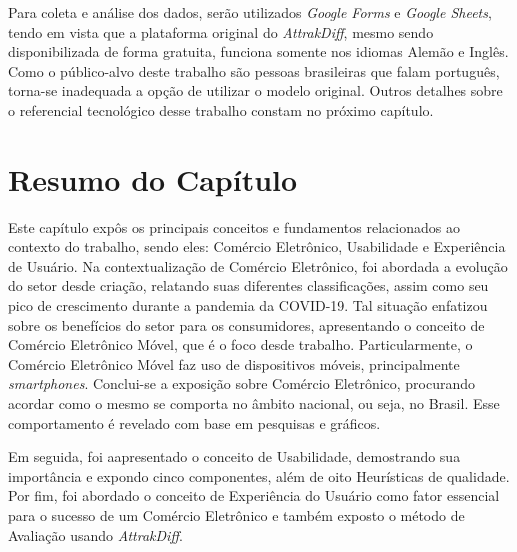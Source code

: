 Para coleta e análise dos dados, serão utilizados \textit{Google Forms} e \textit{Google Sheets}, tendo em vista que a plataforma original do \textit{AttrakDiff}, mesmo sendo disponibilizada de forma gratuita, funciona somente nos idiomas Alemão e Inglês. Como o público-alvo deste trabalho são pessoas brasileiras que falam português, torna-se inadequada a opção de utilizar o modelo original. Outros detalhes sobre o referencial tecnológico desse trabalho constam no próximo capítulo.

\section{Resumo do Capítulo} 
\label{ResumoTeorico}

Este capítulo expôs os principais conceitos e fundamentos relacionados ao contexto do trabalho, sendo eles: Comércio Eletrônico, Usabilidade e Experiência de Usuário.
Na contextualização de Comércio Eletrônico, foi abordada a evolução do setor desde criação, relatando suas diferentes classificações, assim como seu pico de crescimento durante a pandemia da COVID-19. Tal situação enfatizou sobre os benefícios do setor para os consumidores, apresentando o conceito de Comércio Eletrônico Móvel, que é o foco desde trabalho. Particularmente, o Comércio Eletrônico Móvel faz uso de dispositivos móveis, principalmente \textit{smartphones}. Conclui-se a exposição sobre Comércio Eletrônico, procurando acordar como o mesmo se comporta no âmbito nacional, ou seja, no Brasil. Esse comportamento é revelado com base em pesquisas e gráficos.

Em seguida, foi aapresentado o conceito de Usabilidade, demostrando sua importância e expondo cinco componentes, além de oito Heurísticas de qualidade. Por fim, foi abordado o conceito de Experiência do Usuário como fator essencial para o sucesso de um Comércio Eletrônico e também exposto o método de Avaliação usando \textit{AttrakDiff}.